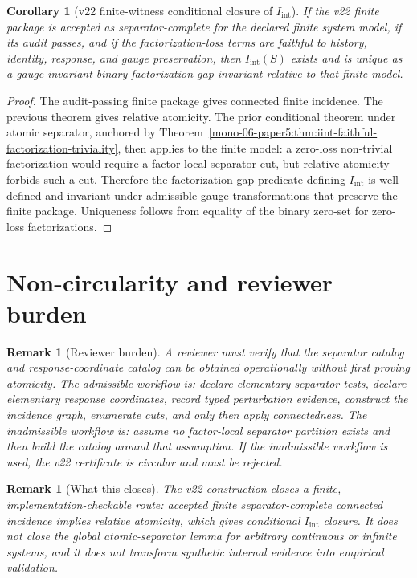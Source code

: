 \documentclass[11pt]{article}
\newtheorem{corollary}[definition]{Corollary}
\newtheorem{remark}[definition]{Remark}
\newcommand{\Iint}{I_{\mathrm{int}}}
\begin{document}
\begin{corollary}[v22 finite-witness conditional closure of $\Iint$]
If the v22 finite package is accepted as separator-complete for the declared finite system model, if its audit passes, and if the factorization-loss terms are faithful to history, identity, response, and gauge preservation, then $\Iint(S)$ exists and is unique as a gauge-invariant binary factorization-gap invariant relative to that finite model.
\end{corollary}

\begin{proof}
The audit-passing finite package gives connected finite incidence. The previous theorem gives relative atomicity. The prior conditional theorem under atomic separator, anchored by Theorem~\ref{mono-06-paper5:thm:iint-faithful-factorization-triviality}, then applies to the finite model: a zero-loss non-trivial factorization would require a factor-local separator cut, but relative atomicity forbids such a cut. Therefore the factorization-gap predicate defining $\Iint$ is well-defined and invariant under admissible gauge transformations that preserve the finite package. Uniqueness follows from equality of the binary zero-set for zero-loss factorizations.
\end{proof}

\section{Non-circularity and reviewer burden}

\begin{remark}[Reviewer burden]
A reviewer must verify that the separator catalog and response-coordinate catalog can be obtained operationally without first proving atomicity. The admissible workflow is: declare elementary separator tests, declare elementary response coordinates, record typed perturbation evidence, construct the incidence graph, enumerate cuts, and only then apply connectedness. The inadmissible workflow is: assume no factor-local separator partition exists and then build the catalog around that assumption. If the inadmissible workflow is used, the v22 certificate is circular and must be rejected.
\end{remark}

\begin{remark}[What this closes]
The v22 construction closes a finite, implementation-checkable route: accepted finite separator-complete connected incidence implies relative atomicity, which gives conditional $\Iint$ closure. It does not close the global atomic-separator lemma for arbitrary continuous or infinite systems, and it does not transform synthetic internal evidence into empirical validation.
\end{remark}
\end{document}
